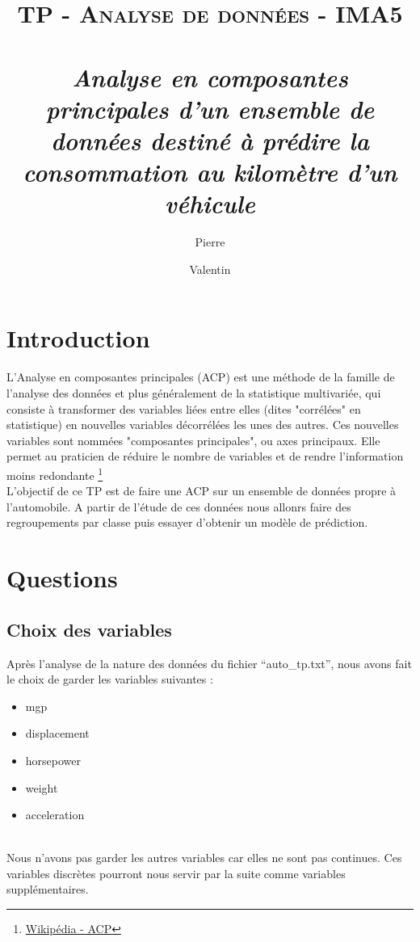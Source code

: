 \documentclass[11pt,oneside]{article}
\title{\textsc{\textbf{TP - Analyse de données}} - IMA5\\~\\
  \Large{\textit{Analyse en composantes principales d'un ensemble de données destiné à prédire la consommation au kilomètre d'un véhicule}}
  }
\date{}
\author{
   Pierre \bsc{Appercé}\\ \and
   Valentin \bsc{vergez}
   }
\begin{document}
	\maketitle

	\renewcommand{\contentsname}{Table des matières}
	\tableofcontents %
	\newpage
	
\section{Introduction}L'Analyse en composantes principales (ACP) est une méthode de la famille de l'analyse des données et plus généralement de la statistique multivariée, qui consiste à transformer des variables liées entre elles (dites "corrélées" en statistique) en nouvelles variables décorrélées les unes des autres. Ces nouvelles variables sont nommées "composantes principales", ou axes principaux. Elle permet au praticien de réduire le nombre de variables et de rendre l'information moins redondante \footnote{\href{http://fr.wikipedia.org/wiki/Analyse_en_composantes_principales}{Wikipédia - ACP}}\\

L'objectif de ce TP est de faire une ACP sur un ensemble de données propre à l'automobile. A partir de l'étude de ces données nous allonrs faire des regroupements par classe puis essayer d'obtenir un modèle de prédiction.\\

\section{Questions}
\subsection{Choix des variables}
Après l'analyse de la nature des données du fichier ``auto\_tp.txt'', nous avons fait le choix de garder les variables suivantes : 
\begin{itemize}
	\item mgp
	\item displacement
	\item horsepower
	\item weight
	\item acceleration
\end{itemize}~\\
Nous n'avons pas garder les autres variables car elles ne sont pas continues. Ces variables discrètes pourront nous servir par la suite comme variables supplémentaires.\\
\end{document}
